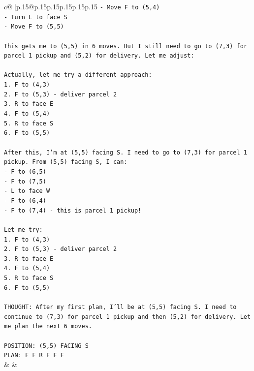 \documentclass{article}
\begin{document}
{\begin{supertabular}{c@{$\;$}|p{.15\linewidth}@{}p{.15\linewidth}p{.15\linewidth}p{.15\linewidth}p{.15\linewidth}p{.15\linewidth}}
{{{\texttt{{-} Move F to (5,4)} \\
\texttt{{-} Turn L to face S} \\
\texttt{{-} Move F to (5,5)} \\
\\ 
\texttt{This gets me to (5,5) in 6 moves. But I still need to go to (7,3) for parcel 1 pickup and (5,2) for delivery. Let me adjust:} \\
\\ 
\texttt{Actually, let me try a different approach:} \\
\texttt{1. F to (4,3)} \\
\texttt{2. F to (5,3) {-} deliver parcel 2} \\
\texttt{3. R to face E} \\
\texttt{4. F to (5,4)} \\
\texttt{5. R to face S} \\
\texttt{6. F to (5,5)} \\
\\ 
\texttt{After this, I'm at (5,5) facing S. I need to go to (7,3) for parcel 1 pickup. From (5,5) facing S, I can:} \\
\texttt{{-} F to (6,5)} \\
\texttt{{-} F to (7,5)} \\
\texttt{{-} L to face W} \\
\texttt{{-} F to (6,4)} \\
\texttt{{-} F to (7,4) {-} this is parcel 1 pickup!} \\
\\ 
\texttt{Let me try:} \\
\texttt{1. F to (4,3)} \\
\texttt{2. F to (5,3) {-} deliver parcel 2} \\
\texttt{3. R to face E} \\
\texttt{4. F to (5,4)} \\
\texttt{5. R to face S} \\
\texttt{6. F to (5,5)} \\
\\ 
\texttt{THOUGHT: After my first plan, I'll be at (5,5) facing S. I need to continue to (7,3) for parcel 1 pickup and then (5,2) for delivery. Let me plan the next 6 moves.} \\
\\ 
\texttt{POSITION: (5,5) FACING S} \\
\texttt{PLAN: F F R F F F} \\
            }
        }
    }
    & & \\ \\


\end{supertabular}}
\end{document}
